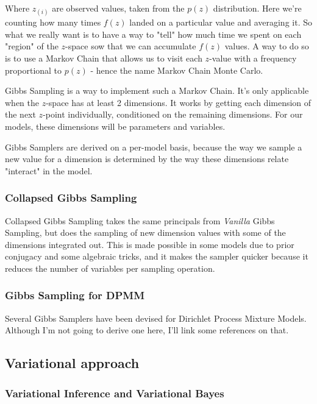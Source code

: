\documentclass[11pt]{article}
\begin{document}
Where \(z_{(i)}\) are observed values, taken from the \(p(z)\)
distribution. Here we're counting how many times \(f(z)\) landed on a
particular value and averaging it. So what we really want is to have a
way to "tell" how much time we spent on each "region" of the \(z\)-space
sow that we can accumulate \(f(z)\) values. A way to do so is to use a
Markov Chain that allows us to visit each \(z\)-value with a frequency
proportional to \(p(z)\) - hence the name Markov Chain Monte Carlo.
	
Gibbs Sampling is a way to implement such a Markov Chain. It's only
applicable when the \(z\)-space has at least 2 dimensions. It works by
getting each dimension of the next \(z\)-point individually, conditioned
on the remaining dimensions. For our models, these dimensions will be
parameters and variables.
	
Gibbs Samplers are derived on a per-model basis, because the way we
sample a new value for a dimension is determined by the way these
dimensions relate "interact" in the model.
	
\subsubsection{Collapsed Gibbs Sampling}\label{collapsed-gibbs-sampling}
	
Collapsed Gibbs Sampling takes the same principals from \emph{Vanilla}
Gibbs Sampling, but does the sampling of new dimension values with some
of the dimensions integrated out. This is made possible in some models
due to prior conjugacy and some algebraic tricks, and it makes the
sampler quicker because it reduces the number of variables per sampling
operation.
	
\subsubsection{Gibbs Sampling for DPMM}\label{gibbs-sampling-for-dpmm}
	
Several Gibbs Samplers have been devised for Dirichlet Process Mixture
Models. Although I'm not going to derive one here, I'll link some
references on that.
	
\subsection{Variational approach}\label{variational-approach}
	
\subsubsection{Variational Inference and Variational Bayes}\label{variational-inference-and-variational-bayes}
	
\end{document}
